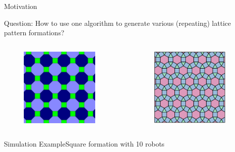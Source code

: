 \documentclass[10pt]{beamer}
\begin{document}
\begin{frame}{Motivation}{}
  \begin{block}{Question: How to use one algorithm to generate
      various (repeating) lattice pattern formations?}
    \begin{columns}
    \begin{column}{.45\textwidth}
      \begin{figure}
        \centering
        \includegraphics[height=1.5in]{figs/tessellation2.png}
      \end{figure}
    \end{column}
    \begin{column}{.45\textwidth}
       \begin{figure}
         \centering
        \includegraphics[height=1.5in]{figs/tessellation1.png}
      \end{figure}
    \end{column}
  \end{columns} 
  \end{block}
\end{frame}
\begin{frame}{Simulation Example}{Square formation with 10 robots}
  \begin{center}
  \end{center}
\end{frame}
\end{document}
